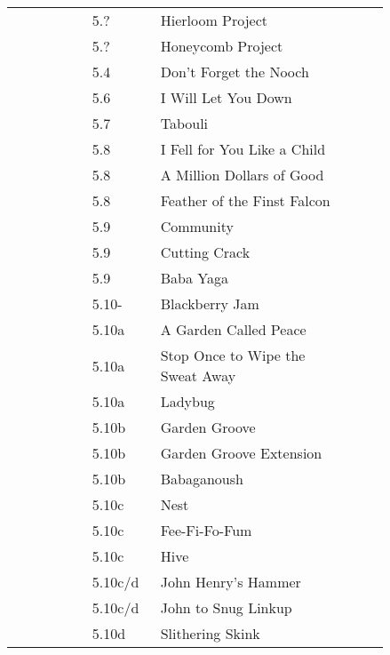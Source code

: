 \begin{flushleft}
\begin{center}
\begin{supertabular}{p{0.18\linewidth}p{0.13\linewidth}p{0.45\linewidth}p{0.08\linewidth}}
&5.?&Hierloom Project & \pageref{rt:Hierloom Project} \\
&5.?&Honeycomb Project & \pageref{rt:Honeycomb Project} \\
&5.4&Don't Forget the Nooch & \pageref{rt:Don't Forget the Nooch} \\
&5.6&I Will Let You Down & \pageref{rt:I Will Let You Down} \\
&5.7&Tabouli & \pageref{rt:Tabouli} \\
&5.8&I Fell for You Like a Child & \pageref{rt:I Fell for You Like a Child} \\
&5.8&A Million Dollars of Good & \pageref{rt:A Million Dollars of Good} \\
&5.8&Feather of the Finst Falcon & \pageref{rt:Feather of the Finst Falcon} \\
&5.9&Community & \pageref{rt:Community} \\
&5.9&Cutting Crack & \pageref{rt:Cutting Crack} \\
&5.9&Baba Yaga & \pageref{rt:Baba Yaga} \\
&5.10-&Blackberry Jam & \pageref{rt:Blackberry Jam} \\
&5.10a&A Garden Called Peace & \pageref{rt:A Garden Called Peace} \\
&5.10a&Stop Once to Wipe the Sweat Away & \pageref{rt:Stop Once to Wipe the Sweat Away} \\
&5.10a&Ladybug & \pageref{rt:Ladybug} \\
&5.10b&Garden Groove & \pageref{rt:Garden Groove} \\
&5.10b&Garden Groove Extension & \pageref{vr:Garden Groove Extension} \\
&5.10b&Babaganoush & \pageref{rt:Babaganoush} \\
&5.10c&Nest & \pageref{rt:Nest} \\
&5.10c&Fee-Fi-Fo-Fum & \pageref{rt:Fee-Fi-Fo-Fum} \\
&5.10c&Hive & \pageref{rt:Hive} \\
&5.10c/d&John Henry's Hammer & \pageref{rt:John Henry's Hammer} \\
&5.10c/d&John to Snug Linkup & \pageref{vr:John to Snug Linkup} \\
&5.10d&Slithering Skink & \pageref{rt:Slithering Skink} \\

\end{supertabular}
\end{center}
\end{flushleft}
